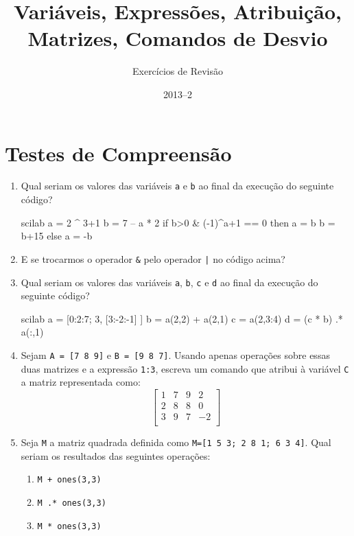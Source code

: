\documentclass[11pt,fleqn]{practice}
\begin{document}
\subtitle{Exercícios de Revisão}
\title{Variáveis, Expressões, Atribuição, Matrizes, Comandos de Desvio}
\date{2013--2}
\maketitle

\tableofcontents

\vspace*{1cm}
\section{Testes de Compreensão}

\begin{enumerate}

\item Qual seriam os valores das variáveis \texttt{a} e \texttt{b} ao final da execução do seguinte código?

\begin{lst}{scilab}
a = 2 ^ 3+1
b = 7 – a * 2
if b>0 \& (-1)^a+1 == 0 then
	a = b
       b = b+15
else 
      a = -b
\end{lst} 

\item E se trocarmos o operador \texttt{\&} pelo operador \texttt{|} no código acima?

\item Qual seriam os valores das variáveis \texttt{a}, \texttt{b}, \texttt{c} e \texttt{d} ao final da execução do seguinte código?

\begin{lst}{scilab}
a = [0:2:7; 3, [3:-2:-1] ]
b = a(2,2) + a(2,1)
c = a(2,3:4)
d = (c * b) .* a(:,1)
\end{lst} 


\item Sejam \texttt{A = [7 8 9]} e \texttt{B = [9 8 7]}. Usando apenas operações sobre essas duas  matrizes e a expressão \texttt{1:3}, escreva um comando que atribui à variável \texttt{C} a matriz representada como:
\[ \left[ \begin{array}{rrrr}
      1 & 7 & 9 & 2    \\
      2 & 8 & 8 & 0   \\
      3 & 9 & 7 & -2 \\
    \end{array} \right]
\] 

\item Seja \texttt{M} a matriz quadrada definida como \texttt{M=[1 5 3; 2 8 1; 6 3 4]}. Qual seriam os resultados das seguintes operações:
\begin{enumerate}
   \item \texttt{M + ones(3,3)}
   \item \texttt{M .* ones(3,3)}
   \item \texttt{M * ones(3,3)}
\end{enumerate}

\end{enumerate}
\end{document}
